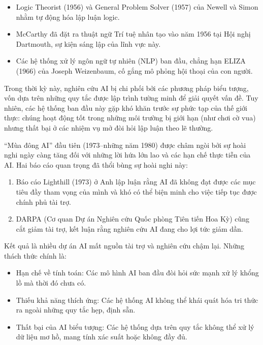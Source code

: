 \begin{itemize}
\item
  Logic Theorist (1956) và General Problem Solver (1957) của Newell và Simon nhằm tự động hóa lập luận logic.
\item
  McCarthy đã đặt ra thuật ngữ Trí tuệ nhân tạo vào năm 1956 tại Hội nghị Dartmouth, sự kiện sáng lập của lĩnh vực này.
\item
  Các hệ thống xử lý ngôn ngữ tự nhiên (NLP) ban đầu, chẳng hạn ELIZA (1966) của Joseph Weizenbaum, cố gắng mô phỏng hội thoại của con người.
\end{itemize}

Trong thời kỳ này, nghiên cứu AI bị chi phối bởi các phương pháp biểu tượng, vốn dựa trên những quy tắc được lập trình tường minh để giải quyết vấn đề. Tuy nhiên, các hệ thống ban đầu này gặp khó khăn trước sự phức tạp của thế giới thực: chúng hoạt động tốt trong những môi trường bị giới hạn (như chơi cờ vua) nhưng thất bại ở các nhiệm vụ mở đòi hỏi lập luận theo lẽ thường.

``Mùa đông AI'' đầu tiên (1973--những năm 1980) được châm ngòi bởi sự hoài nghi ngày càng tăng đối với những lời hứa lớn lao và các hạn chế thực tiễn của AI. Hai báo cáo quan trọng đã thổi bùng sự hoài nghi này:

\begin{enumerate}
\def\labelenumi{\arabic{enumi}.}
\item
  Báo cáo Lighthill (1973) ở Anh lập luận rằng AI đã không đạt được các mục tiêu đầy tham vọng của mình và khó có thể biện minh cho việc tiếp tục được chính phủ tài trợ.
\item
  DARPA (Cơ quan Dự án Nghiên cứu Quốc phòng Tiên tiến Hoa Kỳ) cũng cắt giảm tài trợ, kết luận rằng nghiên cứu AI đang cho lợi tức giảm dần.
\end{enumerate}

Kết quả là nhiều dự án AI mất nguồn tài trợ và nghiên cứu chậm lại. Những thách thức chính là:

\begin{itemize}
\item
  Hạn chế về tính toán: Các mô hình AI ban đầu đòi hỏi sức mạnh xử lý khổng lồ mà thời đó chưa có.
\item
  Thiếu khả năng thích ứng: Các hệ thống AI không thể khái quát hóa tri thức ra ngoài những quy tắc hẹp, định sẵn.
\item
  Thất bại của AI biểu tượng: Các hệ thống dựa trên quy tắc không thể xử lý dữ liệu mơ hồ, mang tính xác suất hoặc không đầy đủ.
\end{itemize}

